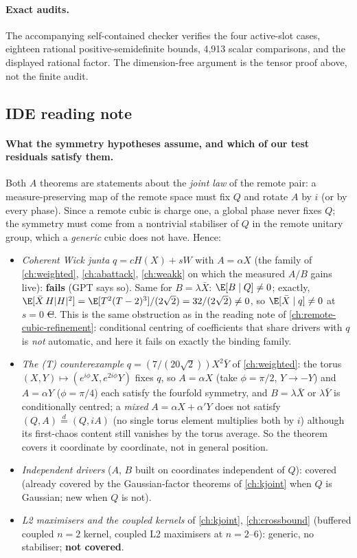 \paragraph{Exact audits.}
The accompanying self-contained checker verifies the four active-slot
cases, eighteen rational positive-semidefinite bounds, 4,913 scalar
comparisons, and the displayed rational factor. The dimension-free
argument is the tensor proof above, not the finite audit.


\subsection{IDE reading note}\label{sec:sharedsector-reading}
\paragraph{What the symmetry hypotheses assume, and which of our test residuals satisfy them.} Both $A$ theorems are statements about the \emph{joint law} of the remote pair: a measure-preserving
map of the remote space must fix $Q$ and rotate $A$ by $i$ (or by every phase). Since a remote cubic is charge one, a global phase never fixes $Q$; the symmetry must come from a nontrivial stabiliser of $Q$
in the remote unitary group, which a \emph{generic} cubic does not have. Hence:
\begin{itemize}[leftmargin=1.5em,itemsep=1pt]
\item \emph{Coherent Wick junta} $q=cH(X)+sW$ with $A=\alpha X$ (the family of \autoref{ch:weighted}, \autoref{ch:abattack}, \autoref{ch:weakk} on which the measured $A/B$ gains live): \textbf{fails} (GPT says so).
Same for $B=\lambda\bar X$: $\E[B\mid Q]\ne0$; exactly, $\E[\bar X\,H|H|^2]=\E[T^2(T-2)^3]/(2\sqrt2)=32/(2\sqrt2)\ne0$, so $\E[\bar X\mid q]\ne0$ at $s=0$ \st{C}. This is the same obstruction as in the
reading note of \autoref{ch:remote-cubic-refinement}: conditional centring of coefficients that share drivers with $q$ is \emph{not} automatic, and here it fails on exactly the binding family.
\item \emph{The (T) counterexample} $q=(7/(20\sqrt2))X^2\bar Y$ of \autoref{ch:weighted}: the torus $(X,Y)\mapsto(e^{i\phi}X,e^{2i\phi}Y)$ fixes $q$, so $A=\alpha X$ (take $\phi=\pi/2$, $Y\to-Y$) and
$A=\alpha Y$ ($\phi=\pi/4$) each satisfy the fourfold symmetry, and $B=\lambda\bar X$ or $\lambda\bar Y$ is conditionally centred; a \emph{mixed} $A=\alpha X+\alpha'Y$ does not satisfy $(Q,A)\overset{d}=(Q,iA)$
(no single torus element multiplies both by $i$) although its first-chaos content still vanishes by the torus average. So the theorem covers it coordinate by coordinate, not in general position.
\item \emph{Independent drivers} ($A$, $B$ built on coordinates independent of $Q$): covered (already covered by the Gaussian-factor theorems of \autoref{ch:kjoint} when $Q$ is Gaussian; new when $Q$ is not).
\item \emph{L2 maximisers and the coupled kernels} of \autoref{ch:kjoint}, \autoref{ch:crossbound} (buffered coupled $n=2$ kernel, coupled L2 maximisers at $n=2$--$6$): generic, no stabiliser; \textbf{not covered}.
\end{itemize}
